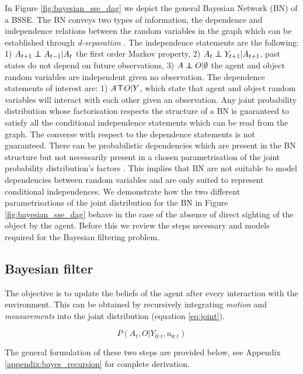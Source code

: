 In Figure \ref{fig:bayesian_sse_dag} we depict the general Bayesian Network (BN) of a BSSE. The BN conveys two types of
information, the dependence and independence relations between the random variables in the graph which can be established
through \textit{d-separation} \cite{BayesBall}. The independence statements are the following: 1) $A_{t+1} \independent A_{t-1} | A_t$ the 
first order Markov property, 2) $A_{t} \independent Y_{t+1} | A_{t+1}$, past states do not depend on future observations, 
3) $A \independent O | \emptyset$ the agent and object random variables
are independent given no observation. The dependence statements of interest are: 1) $A \dependent O | Y$, which 
state that agent and object random variables will interact with each other given an observation. Any joint probability 
distribution whose factorisation  respects the structure of a BN is guaranteed to satisfy all the conditional independence 
statements which can be read from the graph. The converse with respect to the dependence statements is not guaranteed. There 
can be probabilistic dependencies which are present in the BN structure but not necessarily present in a chosen parametrisation 
of the joint probability distribution's factors \cite[p.43]{barberBRML2012}. This implies that BN are not suitable to model 
dependencies between random variables and are only suited to represent conditional independences. We demonstrate 
how the two different parametrisations of the joint distribution for the BN in Figure \ref{fig:bayesian_sse_dag} 
behave in the case of the absence of direct sighting of the object by the agent. Before this we review the steps necessary 
and models required for the Bayesian filtering problem.

\subsection{Bayesian filter}

The objective is to update the beliefs of the agent after every interaction with the environment. 
This can be obtained by recursively integrating \textit{motion} and \textit{measurements} into the joint distribution (equation \ref{eq:joint}).

\begin{equation}
 P(A_t,O|Y_{0:t},u_{0:t}) 
 \label{eq:joint}
\end{equation}

The general formulation of these two steps are provided below, see Appendix \ref{appendix:bayes_recursion} for complete derivation.

